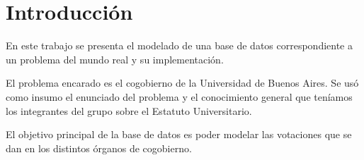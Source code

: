\section{Introducción}
En este trabajo se presenta el modelado de una base de datos correspondiente a un problema del mundo real y su implementación.

El problema encarado es el cogobierno de la Universidad de Buenos Aires. Se usó como insumo el enunciado del problema y el conocimiento general que teníamos los integrantes del grupo sobre el Estatuto Universitario.

El objetivo principal de la base de datos es poder modelar las votaciones que se dan en los distintos órganos de cogobierno.